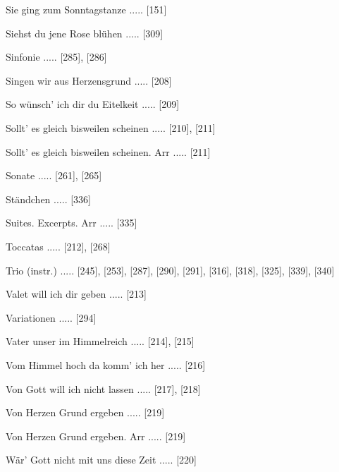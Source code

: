 \documentclass[twocolumn]{book}
\begin{document}
\newline 
Sie ging zum Sonntagstanze ..... [151]

\newline 
Siehst du jene Rose blühen ..... [309]

\newline 
Sinfonie ..... [285], [286]

\newline 
Singen wir aus Herzensgrund ..... [208]

\newline 
So wünsch' ich dir du Eitelkeit ..... [209]

\newline 
Sollt' es gleich bisweilen scheinen ..... [210], [211]

\newline 
Sollt' es gleich bisweilen scheinen. Arr ..... [211]

\newline 
Sonate ..... [261], [265]

\newline 
Ständchen ..... [336]

\newline 
Suites. Excerpts. Arr ..... [335]

\newline 
Toccatas ..... [212], [268]

\newline 
Trio (instr.) ..... [245], [253], [287], [290], [291], [316], [318], [325], [339], [340]

\newline 
Valet will ich dir geben ..... [213]

\newline 
Variationen ..... [294]

\newline 
Vater unser im Himmelreich ..... [214], [215]

\newline 
Vom Himmel hoch da komm' ich her ..... [216]

\newline 
Von Gott will ich nicht lassen ..... [217], [218]

\newline 
Von Herzen Grund ergeben ..... [219]

\newline 
Von Herzen Grund ergeben. Arr ..... [219]

\newline 
Wär' Gott nicht mit uns diese Zeit ..... [220]
\end{document}
